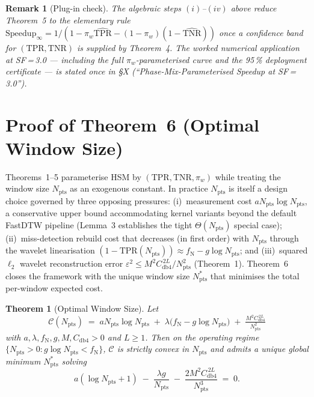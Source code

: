 \documentclass[10pt,twocolumn,a4paper]{article}
\newtheorem{theorem}{Theorem}
\newtheorem{remark}{Remark}
\newcommand{\Npts}{N_{\mathrm{pts}}}
\newcommand{\Nstar}{N^{*}_{\mathrm{pts}}}
\newcommand{\TPR}{\mathrm{TPR}}
\newcommand{\TNR}{\mathrm{TNR}}
\begin{document}
\begin{remark}[Plug-in check]
The algebraic steps $(i)$--$(iv)$ above reduce Theorem~5 to the
elementary rule $\mathrm{Speedup}_\infty=1/(1{-}\pi_w\hat{\TPR}
{-}(1{-}\pi_w)(1{-}\hat{\TNR}))$ once a confidence band for
$(\TPR,\TNR)$ is supplied by Theorem~4.  The worked numerical
application at SF\,=\,3.0 --- including the full
$\pi_w$-parameterised curve and the 95\,\% deployment
certificate --- is stated once in \S X (``Phase-Mix-Parameterised
Speedup at SF\,=\,3.0'').
\end{remark}

\section{Proof of Theorem~6 (Optimal Window Size)}\label{supp:thm6}

Theorems~1--5 parameterise HSM by $(\TPR,\TNR,\pi_w)$ while treating
the window size $\Npts$ as an exogenous constant. In practice $\Npts$
is itself a design choice governed by three opposing pressures:
(i)~measurement cost $a\Npts\log\Npts$, a conservative upper bound
accommodating kernel variants beyond the default FastDTW pipeline
(Lemma~3 establishes the tight $\Theta(\Npts)$ special case);
(ii)~miss-detection rebuild cost that decreases (in first order) with
$\Npts$ through the wavelet linearisation
$(1{-}\TPR(\Npts))\!\approx\!f_{\mathrm{N}}\!-\!g\log\Npts$;
and (iii)~squared $\ell_{2}$ wavelet reconstruction error
$\varepsilon^{2}\!\le\!M^{2}C_{\mathrm{db4}}^{\,2L}/\Npts^{2}$
(Theorem~1). Theorem~6 closes the framework with the unique window
size $\Nstar$ that minimises the total per-window expected cost.

\begin{theorem}[Optimal Window Size]\label{thm:supp-optwin}
Let
\[
\mathcal{C}(\Npts)\;=\;a\Npts\log\Npts\;+\;\lambda\bigl(f_{\mathrm{N}}\!-\!g\log\Npts\bigr)\;+\;\tfrac{M^{2}C_{\mathrm{db4}}^{\,2L}}{\Npts^{2}}
\]
with $a,\lambda,f_{\mathrm{N}},g,M,C_{\mathrm{db4}}\!>\!0$ and $L\!\ge\!1$.
Then on the operating regime $\{\Npts\!>\!0\!:\!g\log\Npts<f_{\mathrm{N}}\}$,
$\mathcal{C}$ is strictly convex in $\Npts$ and admits a unique global
minimum $\Nstar$ solving
\begin{equation}\label{eq:supp-nstar}
a(\log\Npts\!+\!1)\;-\;\frac{\lambda g}{\Npts}\;-\;\frac{2M^{2}C_{\mathrm{db4}}^{\,2L}}{\Npts^{3}}\;=\;0.
\end{equation}
\end{theorem}
\end{document}

